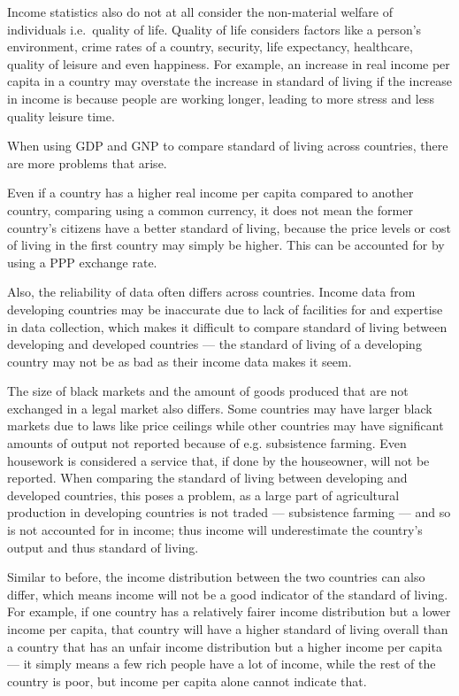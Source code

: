 \documentclass[Economics.tex]{subfiles}
\begin{document}
Income statistics also do not at all consider the non-material welfare of individuals i.e.\ quality of life. Quality of life considers factors like a person's environment, crime rates of a country, security, life expectancy, healthcare, quality of leisure and even happiness. For example, an increase in real income per capita in a country may overstate the increase in standard of living if the increase in income is because people are working longer, leading to more stress and less quality leisure time.

When using GDP and GNP to compare standard of living across countries, there are more problems that arise.

Even if a country has a higher real income per capita compared to another country, comparing using a common currency, it does not mean the former country's citizens have a better standard of living, because the price levels or cost of living in the first country may simply be higher. This can be accounted for by using a PPP exchange rate.

Also, the reliability of data often differs across countries. Income data from developing countries may be inaccurate due to lack of facilities for and expertise in data collection, which makes it difficult to compare standard of living between developing and developed countries --- the standard of living of a developing country may not be as bad as their income data makes it seem.

The size of black markets and the amount of goods produced that are not exchanged in a legal market also differs. Some countries may have larger black markets due to laws like price ceilings while other countries may have significant amounts of output not reported because of e.g. subsistence farming. Even housework is considered a service that, if done by the houseowner, will not be reported. When comparing the standard of living between developing and developed countries, this poses a problem, as a large part of agricultural production in developing countries is not traded --- subsistence farming --- and so is not accounted for in income; thus income will underestimate the country's output and thus standard of living.

Similar to before, the income distribution between the two countries can also differ, which means income will not be a good indicator of the standard of living. For example, if one country has a relatively fairer income distribution but a lower income per capita, that country will have a higher standard of living overall than a country that has an unfair income distribution but a higher income per capita --- it simply means a few rich people have a lot of income, while the rest of the country is poor, but income per capita alone cannot indicate that.
\end{document}
